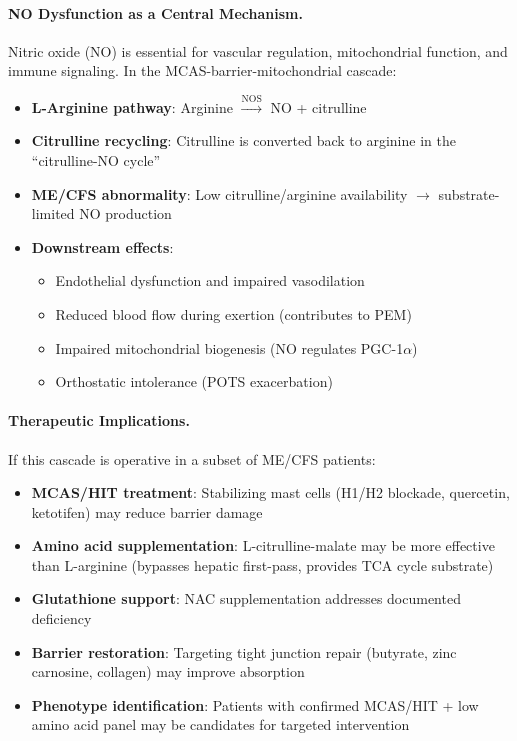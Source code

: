 \paragraph{NO Dysfunction as a Central Mechanism.}
\label{par:no-dysfunction}

Nitric oxide (NO) is essential for vascular regulation, mitochondrial function, and immune signaling. In the MCAS-barrier-mitochondrial cascade:

\begin{itemize}
    \item \textbf{L-Arginine pathway}: Arginine $\xrightarrow{\text{NOS}}$ NO + citrulline
    \item \textbf{Citrulline recycling}: Citrulline is converted back to arginine in the ``citrulline-NO cycle''
    \item \textbf{ME/CFS abnormality}: Low citrulline/arginine availability $\rightarrow$ substrate-limited NO production
    \item \textbf{Downstream effects}:
    \begin{itemize}
        \item Endothelial dysfunction and impaired vasodilation
        \item Reduced blood flow during exertion (contributes to PEM)
        \item Impaired mitochondrial biogenesis (NO regulates PGC-1$\alpha$)
        \item Orthostatic intolerance (POTS exacerbation)
    \end{itemize}
\end{itemize}

\paragraph{Therapeutic Implications.}

If this cascade is operative in a subset of ME/CFS patients:

\begin{itemize}
    \item \textbf{MCAS/HIT treatment}: Stabilizing mast cells (H1/H2 blockade, quercetin, ketotifen) may reduce barrier damage
    \item \textbf{Amino acid supplementation}: L-citrulline-malate may be more effective than L-arginine (bypasses hepatic first-pass, provides TCA cycle substrate)
    \item \textbf{Glutathione support}: NAC supplementation addresses documented deficiency
    \item \textbf{Barrier restoration}: Targeting tight junction repair (butyrate, zinc carnosine, collagen) may improve absorption
    \item \textbf{Phenotype identification}: Patients with confirmed MCAS/HIT + low amino acid panel may be candidates for targeted intervention
\end{itemize}

